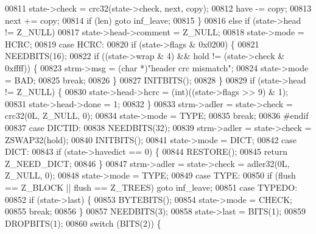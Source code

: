\begin{DoxyCode}
{{{{00811                     state->check = crc32(state->check, next, copy);
00812                 have -= copy;
00813                 next += copy;
00814                 \textcolor{keywordflow}{if} (len) \textcolor{keywordflow}{goto} inf\_leave;
00815             \}
00816             \textcolor{keywordflow}{else} \textcolor{keywordflow}{if} (state->head != Z\_NULL)
00817                 state->head->comment = Z\_NULL;
00818             state->mode = HCRC;
00819         \textcolor{keywordflow}{case} HCRC:
00820             \textcolor{keywordflow}{if} (state->flags & 0x0200) \{
00821                 NEEDBITS(16);
00822                 \textcolor{keywordflow}{if} ((state->wrap & 4) && hold != (state->check & 0xffff)) \{
00823                     strm->msg = (\textcolor{keywordtype}{char} *)\textcolor{stringliteral}{"header crc mismatch"};
00824                     state->mode = BAD;
00825                     \textcolor{keywordflow}{break};
00826                 \}
00827                 INITBITS();
00828             \}
00829             \textcolor{keywordflow}{if} (state->head != Z\_NULL) \{
00830                 state->head->hcrc = (int)((state->flags >> 9) & 1);
00831                 state->head->done = 1;
00832             \}
00833             strm->adler = state->check = crc32(0L, Z\_NULL, 0);
00834             state->mode = TYPE;
00835             \textcolor{keywordflow}{break};
00836 \textcolor{preprocessor}{#endif}
00837         \textcolor{keywordflow}{case} DICTID:
00838             NEEDBITS(32);
00839             strm->adler = state->check = ZSWAP32(hold);
00840             INITBITS();
00841             state->mode = DICT;
00842         \textcolor{keywordflow}{case} DICT:
00843             \textcolor{keywordflow}{if} (state->havedict == 0) \{
00844                 RESTORE();
00845                 \textcolor{keywordflow}{return} Z\_NEED\_DICT;
00846             \}
00847             strm->adler = state->check = adler32(0L, Z\_NULL, 0);
00848             state->mode = TYPE;
00849         \textcolor{keywordflow}{case} TYPE:
00850             \textcolor{keywordflow}{if} (flush == Z\_BLOCK || flush == Z\_TREES) \textcolor{keywordflow}{goto} inf\_leave;
00851         \textcolor{keywordflow}{case} TYPEDO:
00852             \textcolor{keywordflow}{if} (state->last) \{
00853                 BYTEBITS();
00854                 state->mode = CHECK;
00855                 \textcolor{keywordflow}{break};
00856             \}
00857             NEEDBITS(3);
00858             state->last = BITS(1);
00859             DROPBITS(1);
00860             \textcolor{keywordflow}{switch} (BITS(2)) \{
}}}}
\end{DoxyCode}
